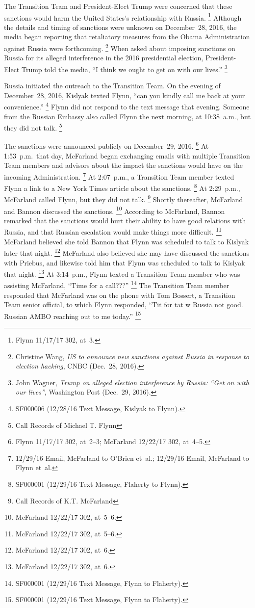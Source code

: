 The Transition Team and President-Elect Trump were concerned that these sanctions would harm the United States's relationship with Russia.%
\footnote{Flynn 11/17/17 302, at~3.}
Although the details and timing of sanctions were unknown on December~28, 2016, the media began reporting that retaliatory measures from the Obama Administration against Russia were forthcoming.%
\footnote{Christine Wang, \textit{US to announce new sanctions against Russia in response to election hacking}, CNBC (Dec.~28, 2016).}
When asked about imposing sanctions on Russia for its alleged interference in the 2016 presidential election, President-Elect Trump told the media, ``I think we ought to get on with our lives.''%
\footnote{John Wagner, \textit{Trump on alleged election interference by Russia: ``Get on with our lives''}, Washington Post (Dec.~29, 2016).}

Russia initiated the outreach to the Transition Team.
On the evening of December~28, 2016, Kislyak texted Flynn, ``can you kindly call me back at your convenience.''%
\footnote{SF000006 (12/28/16 Text Message, Kislyak to Flynn).}
Flynn did not respond to the text message that evening.
Someone from the Russian Embassy also called Flynn the next morning, at 10:38~a.m., but they did not talk.%
\footnote{Call Records of Michael T. Flynn }

The sanctions were announced publicly on December~29, 2016.%
\footnote{Flynn 11/17/17 302, at~2--3;
McFarland 12/22/17 302, at~4--5.}
At 1:53~p.m.\ that day, McFarland began exchanging emails with multiple Transition Team members and advisors about the impact the sanctions would have on the incoming Administration.%
\footnote{12/29/16 Email, McFarland to O'Brien et~al.;
12/29/16 Email, McFarland to Flynn et~al.}
At 2:07~p.m., a Transition Team member texted Flynn a link to a New York Times article about the sanctions.%
\footnote{SF000001 (12/29/16 Text Message, Flaherty to Flynn).}
At 2:29~p.m., McFarland called Flynn, but they did not talk.%
\footnote{Call Records of K.T. McFarland }
Shortly thereafter, McFarland and Bannon discussed the sanctions.%
\footnote{McFarland 12/22/17 302, at~5--6.}
According to McFarland, Bannon remarked that the sanctions would hurt their ability to have good relations with Russia, and that Russian escalation would make things more difficult.%
\footnote{McFarland 12/22/17 302, at~5--6.}
McFarland believed she told Bannon that Flynn was scheduled to talk to Kislyak later that night.%
\footnote{McFarland 12/22/17 302, at~6.}
McFarland also believed she may have discussed the sanctions with Priebus, and likewise told him that Flynn was scheduled to talk to Kislyak that night.%
\footnote{McFarland 12/22/17 302, at~6.}
At 3:14~p.m., Flynn texted a Transition Team member who was assisting McFarland, ``Time for a call???''%
\footnote{SF000001 (12/29/16 Text Message, Flynn to Flaherty).}
The Transition Team member responded that McFarland was on the phone with Tom Bossert, a Transition Team senior official, to which Flynn responded, ``Tit for tat w Russia not good.
Russian AMBO reaching out to me today.''%
\footnote{SF000001 (12/29/16 Text Message, Flynn to Flaherty).}

